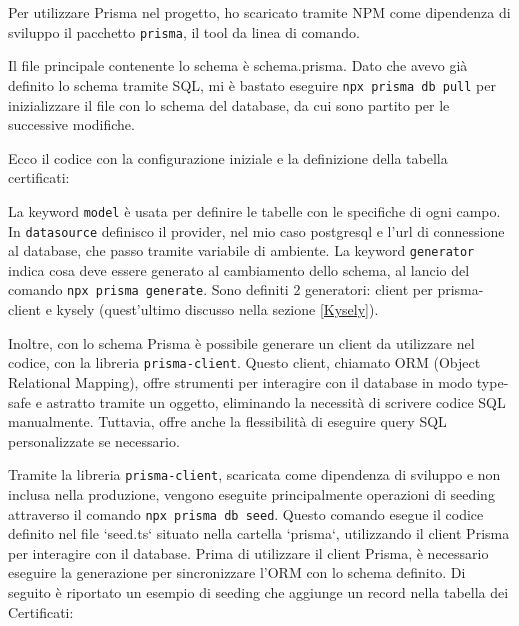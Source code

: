\vspace{0,3cm}

Per utilizzare Prisma nel progetto, ho scaricato tramite NPM come dipendenza di sviluppo il pacchetto \texttt{prisma}, il tool da linea di comando.

Il file principale contenente lo schema è schema.prisma. Dato che avevo già definito lo schema tramite SQL, mi è bastato eseguire \lstinline[language=Bash]{npx prisma db pull} per inizializzare il file con lo schema del database, da cui sono partito per le successive modifiche.

\vspace{0,3cm}

Ecco il codice con la configurazione iniziale e la definizione della tabella certificati:




La keyword \texttt{model} è usata per definire le tabelle con le specifiche di ogni campo.
In \texttt{datasource} definisco il provider, nel mio caso postgresql e l'url di connessione al database, che passo tramite variabile di ambiente.
La keyword \texttt{generator} indica cosa deve essere generato al cambiamento dello schema, al lancio del comando \lstinline[language=Bash]{npx prisma generate}. Sono definiti 2 generatori: client per prisma-client e kysely (quest'ultimo discusso nella sezione \ref{Kysely}).  

\vspace{0,3cm}

\label{prisma_client}
Inoltre, con lo schema Prisma è possibile generare un client da utilizzare nel codice, con la libreria \texttt{prisma-client}. Questo client, chiamato ORM (Object Relational Mapping), offre strumenti per interagire con il database in modo type-safe e astratto tramite un oggetto, eliminando la necessità di scrivere codice SQL manualmente. Tuttavia, offre anche la flessibilità di eseguire query SQL personalizzate se necessario.

Tramite la libreria \texttt{prisma-client}, scaricata come dipendenza di sviluppo e non inclusa nella produzione, vengono eseguite principalmente operazioni di seeding attraverso il comando \lstinline[language=Bash]{npx prisma db seed}. Questo comando esegue il codice definito nel file `seed.ts` situato nella cartella `prisma`, utilizzando il client Prisma per interagire con il database. Prima di utilizzare il client Prisma, è necessario eseguire la generazione per sincronizzare l'ORM con lo schema definito. Di seguito è riportato un esempio di seeding che aggiunge un record nella tabella dei Certificati:

